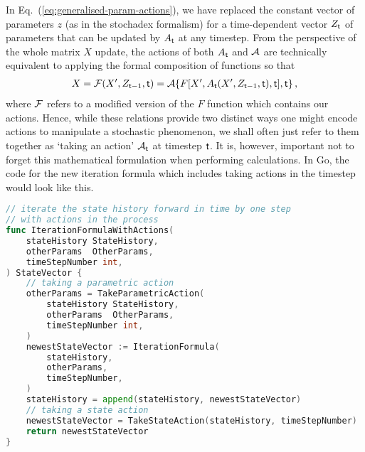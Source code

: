In Eq.~(\ref{eq:generalised-param-actions}), we have replaced the constant vector of parameters $z$ (as in the stochadex formalism) for a time-dependent vector $Z_{{\sf t}}$ of parameters that can be updated by $A_{\sf t}$ at any timestep. From the perspective of the whole matrix $X$ update, the actions of both $A_{\sf t}$ and ${\cal A}$ are technically equivalent to applying the formal composition of functions so that
\begin{align}
X = {\cal F}(X', Z_{{\sf t}-1}, {\sf t})={\cal A}\{ F[X', A_{\sf t}(X', Z_{{\sf t}-1}, {\sf t}), {\sf t}], {\sf t} \}\,,
\end{align}
where ${\cal F}$ refers to a modified version of the $F$ function which contains our actions. Hence, while these relations provide two distinct ways one might encode actions to manipulate a stochastic phenomenon, we shall often just refer to them together as `taking an action' ${\cal A}_{\sf t}$ at timestep ${\sf t}$. It is, however, important not to forget this mathematical formulation when performing calculations. In Go, the code for the new iteration formula which includes taking actions in the timestep would look like this.

\begin{lstlisting}[language=Go]
// iterate the state history forward in time by one step
// with actions in the process
func IterationFormulaWithActions(
    stateHistory StateHistory, 
    otherParams  OtherParams,
    timeStepNumber int,
) StateVector {
    // taking a parametric action
    otherParams = TakeParametricAction(
        stateHistory StateHistory, 
        otherParams  OtherParams,
        timeStepNumber int,
    )
    newestStateVector := IterationFormula(
        stateHistory, 
        otherParams,
        timeStepNumber,
    )
    stateHistory = append(stateHistory, newestStateVector)
    // taking a state action
    newestStateVector = TakeStateAction(stateHistory, timeStepNumber)
    return newestStateVector
}
\end{lstlisting}